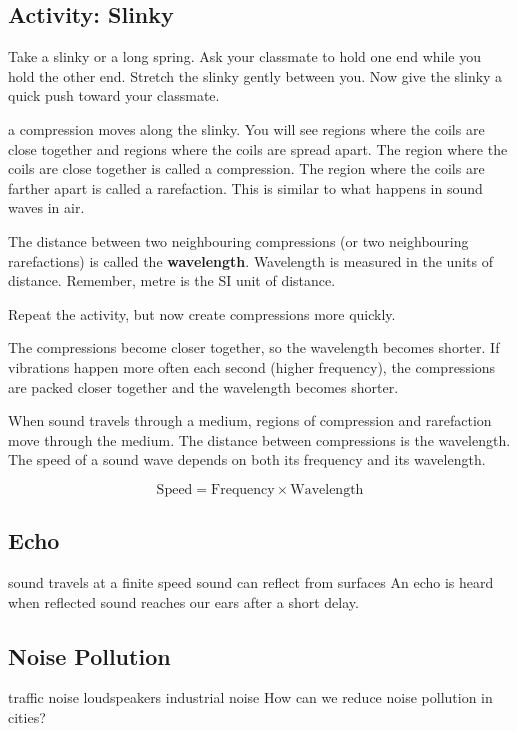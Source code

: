 \documentclass[12pt,a4paper]{tufte-handout}
\begin{document}
\subsection{Activity: Slinky}

Take a slinky or a long spring. Ask your classmate to hold one end while you hold the other end. Stretch the slinky gently between you. Now give the slinky a quick push toward your classmate.

 a compression moves along the slinky. You will see regions where the coils are close together and regions where the coils are spread apart. The region where the coils are close together is called a compression. The region where the coils are farther apart is called a rarefaction. This is similar to what happens in sound waves in air.

The distance between two neighbouring compressions (or two neighbouring rarefactions) is called the \textbf{wavelength}. Wavelength is measured in the units of distance. Remember, metre is the SI unit of distance.

Repeat the activity, but now create compressions more quickly.

 The compressions become closer together, so the wavelength becomes shorter. If vibrations happen more often each second (higher frequency), the compressions are packed closer together and the wavelength becomes shorter.

When sound travels through a medium, regions of compression and rarefaction move through the medium. The distance between compressions is the wavelength. The speed of a sound wave depends on both its frequency and its wavelength.


\begin{equation}
\text{Speed} = \text{Frequency}\times\text{Wavelength}
\end{equation}


\subsection{Echo}
sound travels at a finite speed
sound can reflect from surfaces
An echo is heard when reflected sound reaches our ears after a short delay.

\subsection{Noise Pollution}
traffic noise
loudspeakers
industrial noise
How can we reduce noise pollution in cities?
\end{document}
